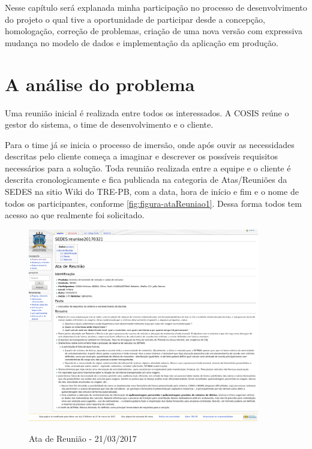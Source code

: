 Nesse capítulo será explanada minha participação no processo de desenvolvimento do projeto o qual tive a oportunidade de participar desde a concepção, homologação, correção de problemas, criação de uma nova versão com expressiva mudança no modelo de dados e implementação da aplicação em produção. 

\section{A análise do problema}
\label{sec:atividadesRealizadasInicio}

Uma reunião inicial é realizada entre todos os interessados. A COSIS reúne o gestor do sistema, o time de desenvolvimento e o cliente. 

Para o time já se inicia o processo de imersão, onde após ouvir as necessidades descritas pelo cliente começa a imaginar e descrever os possíveis requisitos necessários para a solução. 
Toda reunião realizada entre a equipe e o cliente é descrita cronologicamente e fica publicada na categoria de Atas/Reuniões da SEDES na sitio Wiki do TRE-PB, com a data, hora de início e fim e o nome de todos os participantes, conforme \autoref{fig:figura-ataReuniao1}. Dessa forma todos tem acesso ao que realmente foi solicitado.

\begin{figure}[!htb]
    \centering
    \caption{Ata de Reunião - 21/03/2017}
    \includegraphics[width=0.9\textwidth]{dados/figuras/veiculos-reuniao20170321}
    \label{fig:figura-ataReuniao1}
\end{figure}

